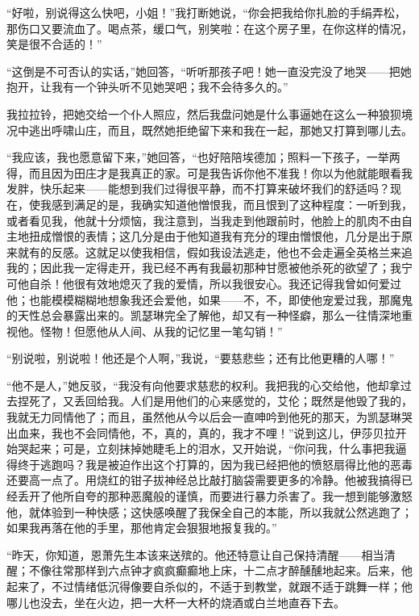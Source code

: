 \par “好啦，别说得这么快吧，小姐！”我打断她说，“你会把我给你扎脸的手绢弄松，那伤口又要流血了。喝点茶，缓口气，别笑啦：在这个房子里，在你这样的情况，笑是很不合适的！”
\par “这倒是不可否认的实话，”她回答，“听听那孩子吧！她一直没完没了地哭——把她抱开，让我有一个钟头听不见她哭吧；我不会待多久的。”
\par 我拉拉铃，把她交给一个仆人照应，然后我盘问她是什么事逼她在这么一种狼狈境况中逃出呼啸山庄，而且，既然她拒绝留下来和我在一起，那她又打算到哪儿去。
\par “我应该，我也愿意留下来，”她回答，“也好陪陪埃德加；照料一下孩子，一举两得，而且因为田庄才是我真正的家。可是我告诉你他不准我！你以为他就能眼看我发胖，快乐起来——能想到我们过得很平静，而不打算来破坏我们的舒适吗？现在，使我感到满足的是，我确实知道他憎恨我，而且恨到了这种程度：一听到我，或者看见我，他就十分烦恼，我注意到，当我走到他跟前时，他脸上的肌肉不由自主地扭成憎恨的表情；这几分是由于他知道我有充分的理由憎恨他，几分是出于原来就有的反感。这就足以使我相信，假如我设法逃走，他也不会走遍全英格兰来追我的；因此我一定得走开，我已经不再有我最初那种甘愿被他杀死的欲望了；我宁可他自杀！他很有效地熄灭了我的爱情，所以我很安心。我还记得我曾如何爱过他；也能模模糊糊地想象我还会爱他，如果——不，不，即使他宠爱过我，那魔鬼的天性总会暴露出来的。凯瑟琳完全了解他，却又有一种怪癖，那么一往情深地重视他。怪物！但愿他从人间、从我的记忆里一笔勾销！”
\par “别说啦，别说啦！他还是个人啊，”我说，“要慈悲些；还有比他更糟的人哪！”
\par “他不是人，”她反驳，“我没有向他要求慈悲的权利。我把我的心交给他，他却拿过去捏死了，又丢回给我。人们是用他们的心来感觉的，艾伦；既然是他毁了我的，我就无力同情他了；而且，虽然他从今以后会一直呻吟到他死的那天，为凯瑟琳哭出血来，我也不会同情他，不，真的，真的，我才不哩！”说到这儿，伊莎贝拉开始哭起来；可是，立刻抹掉她睫毛上的泪水，又开始说，“你问我，什么事把我逼得终于逃跑吗？我是被迫作出这个打算的，因为我已经把他的愤怒扇得比他的恶毒还要高一点了。用烧红的钳子拔神经总比敲打脑袋需要更多的冷静。他被我搞得已经丢开了他所自夸的那种恶魔般的谨慎，而要进行暴力杀害了。我一想到能够激怒他，就体验到一种快感；这快感唤醒了我保全自己的本能，所以我就公然逃跑了；如果我再落在他的手里，那他肯定会狠狠地报复我的。”
\par “昨天，你知道，恩萧先生本该来送殡的。他还特意让自己保持清醒——相当清醒；不像往常那样到六点钟才疯疯癫癫地上床，十二点才醉醺醺地起来。后来，他起来了，不过情绪低沉得像要自杀似的，不适于到教堂，就跟不适于跳舞一样；他哪儿也没去，坐在火边，把一大杯一大杯的烧酒或白兰地直吞下去。

